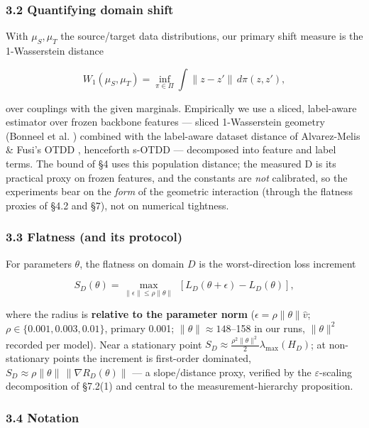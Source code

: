 \documentclass[pdflatex,sn-mathphys-ay]{sn-jnl}
\begin{document}
\subsubsection*{3.2 Quantifying domain shift}

With $\mu_S,\mu_T$ the source/target data distributions, our primary shift measure is the 1-Wasserstein distance

\[W_1(\mu_S,\mu_T) = \inf_{\pi\in\Pi}\int \|z-z'\|\,d\pi(z,z'), \tag{1}\]

over couplings with the given marginals. Empirically we use a sliced, label-aware estimator over frozen backbone features --- sliced 1-Wasserstein geometry (Bonneel et al. \citep{pototzky2022}) combined with the label-aware dataset distance of Alvarez-Melis \& Fusi's OTDD \citep{tran2019}, henceforth s-OTDD --- decomposed into feature and label terms. The bound of \S{}4 uses this population distance; the measured D is its practical proxy on frozen features, and the constants are \emph{not} calibrated, so the experiments bear on the \emph{form} of the geometric interaction (through the flatness proxies of \S{}4.2 and \S{}7), not on numerical tightness.

\subsubsection*{3.3 Flatness (and its protocol)}

For parameters $\theta$, the flatness on domain $D$ is the worst-direction loss increment

\[S_D(\theta) = \max_{\|\epsilon\|\le \rho\|\theta\|}\;[L_D(\theta+\epsilon)-L_D(\theta)], \tag{2}\]

where the radius is \textbf{relative to the parameter norm} ($\epsilon = \rho\|\theta\|\hat v$; $\rho \in \{0.001, 0.003, 0.01\}$, primary 0.001; $\|\theta\| \approx 148$--158 in our runs, $\|\theta\|^2$ recorded per model). Near a stationary point $S_D \approx \tfrac{\rho^2\|\theta\|^2}{2}\lambda_{\max}(H_D)$; at non-stationary points the increment is first-order dominated, $S_D \approx \rho\|\theta\|\,\|\nabla R_D(\theta)\|$ --- a slope/distance proxy, verified by the \ensuremath{\varepsilon}-scaling decomposition of \S{}7.2(1) and central to the measurement-hierarchy proposition.

\subsubsection*{3.4 Notation}
\end{document}
